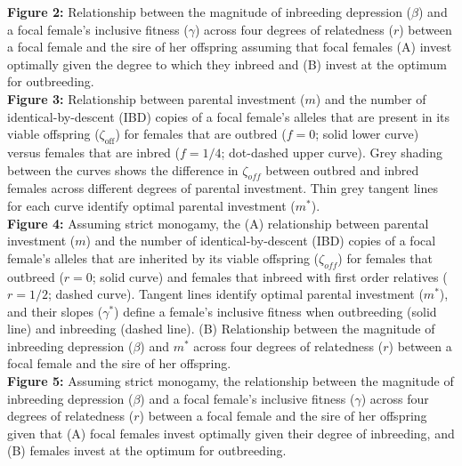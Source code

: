 \documentclass[12pt]{article}
\begin{document}
\noindent \textbf{Figure 2:} Relationship between the magnitude of inbreeding depression ($\beta$) and a focal female's inclusive fitness ($\gamma$) across four degrees of relatedness ($r$) between a focal female and the sire of her offspring assuming that focal females (A) invest optimally given the degree to which they inbreed and (B) invest at the optimum for outbreeding. \\

\noindent \textbf{Figure 3:} Relationship between parental investment ($m$) and the number of identical-by-descent (IBD) copies of a focal female's alleles that are present in its viable offspring ($\zeta_{\textrm{off}}$) for females that are outbred ($f=0$; solid lower curve) versus females that are inbred ($f=1/4$; dot-dashed upper curve). Grey shading between the curves shows the difference in $\zeta_{off}$ between outbred and inbred females across different degrees of parental investment. Thin grey tangent lines for each curve identify optimal parental investment ($m^{*}$). \\

\noindent \textbf{Figure 4:} Assuming strict monogamy, the (A) relationship between parental investment ($m$) and the number of identical-by-descent (IBD) copies of a focal female's alleles that are inherited by its viable offspring ($\zeta_{off}$) for females that outbreed ($r=0$; solid curve) and females that inbreed with first order relatives ($r=1/2$; dashed curve). Tangent lines identify optimal parental investment ($m^{*}$), and their slopes ($\gamma^{*}$) define a female's inclusive fitness when outbreeding (solid line) and inbreeding (dashed line). (B) Relationship between the magnitude of inbreeding depression ($\beta$) and $m^{*}$ across four degrees of relatedness ($r$) between a focal female and the sire of her offspring. \\

\noindent \textbf{Figure 5:} Assuming strict monogamy, the relationship between the magnitude of inbreeding depression ($\beta$) and a focal female's inclusive fitness ($\gamma$) across four degrees of relatedness ($r$) between a focal female and the sire of her offspring given that (A) focal females invest optimally given their degree of inbreeding, and (B) females invest at the optimum for outbreeding. \\
\end{document}
